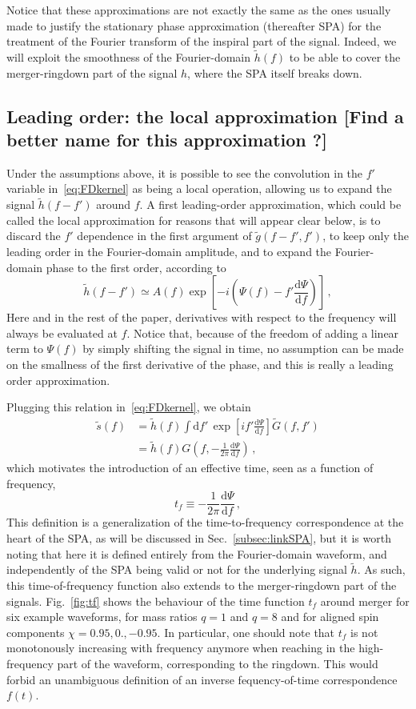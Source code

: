 \documentclass[aps,showpacs,twocolumn,
prd,superscriptaddress,nofootinbib]{revtex4-1}
\newcommand{\be}{\begin{equation}}
\newcommand{\ee}{\end{equation}}
\newcommand\ud{{\mathrm{d}}}
\newcommand{\nn}{\nonumber}
\newcommand{\tf}{t_{f}}
\newcommand{\SM}[1]{{\color{Red} #1}}
\begin{document}
Notice that these approximations are not exactly the same as the ones usually made to justify the stationary phase approximation (thereafter SPA) for the treatment of the Fourier transform of the inspiral part of the signal. Indeed, we will exploit the smoothness of the Fourier-domain $\tilde{h}(f)$ to be able to cover the merger-ringdown part of the signal $h$, where the SPA itself breaks down.


\subsection{Leading order: the local approximation \SM{[Find a better name for this approximation ?]}}
\label{subsec:LLP}

Under the assumptions above, it is possible to see the convolution in the $f'$ variable in~\eqref{eq:FDkernel} as being a local operation, allowing us to expand the signal $\tilde{h}(f-f')$ around $f$. A first leading-order approximation, which could be called the local approximation for reasons that will appear clear below, is to discard the $f'$ dependence in the first argument of $\tilde{g}(f-f', f')$, to keep only the leading order in the Fourier-domain amplitude, and to expand the Fourier-domain phase to the first order, according to
\be
	\tilde{h}(f-f') \simeq A(f) \exp\left[ -i\left( \Psi(f) - f' \frac{\ud \Psi}{\ud f} \right) \right] \,,
\ee
Here and in the rest of the paper, derivatives with respect to the frequency will always be evaluated at $f$. Notice that, because of the freedom of adding a linear term to $\Psi(f)$ by simply shifting the signal in time, no assumption can be made on the smallness of the first derivative of the phase, and this is really a leading order approximation.

Plugging this relation in~\eqref{eq:FDkernel}, we obtain
\begin{align}
	\tilde{s}(f) &= \tilde{h}(f) \int \ud f' \, \exp\left[ i f' \frac{\ud \Psi}{\ud f} \right] \tilde{G}(f,f') \nn\\
	&= \tilde{h}(f) G\left( f, -\frac{1}{2\pi} \frac{\ud \Psi}{\ud f} \right) \,,
\end{align}
which motivates the introduction of an effective time, seen as a function of frequency,
\be\label{eq:deftf}
	\tf \equiv -\frac{1}{2\pi} \frac{\ud \Psi}{\ud f} \,,
\ee
This definition is a generalization of the time-to-frequency correspondence at the heart of the SPA, as will be discussed in Sec.~\ref{subsec:linkSPA}, but it is worth noting that here it is defined entirely from the Fourier-domain waveform, and independently of the SPA being valid or not for the underlying signal $\tilde{h}$. As such, this time-of-frequency function also extends to the merger-ringdown part of the signals. Fig.~\ref{fig:tf} shows the behaviour of the time function $\tf$ around merger for six example waveforms, for mass ratios $q=1$ and $q=8$ and for aligned spin components $\chi=0.95,0.,-0.95$. In particular, one should note that $\tf$ is not monotonously increasing with frequency anymore when reaching in the high-frequency part of the waveform, corresponding to the ringdown. This would forbid an unambiguous definition of an inverse fequency-of-time correspondence $f(t)$. 
\end{document}
